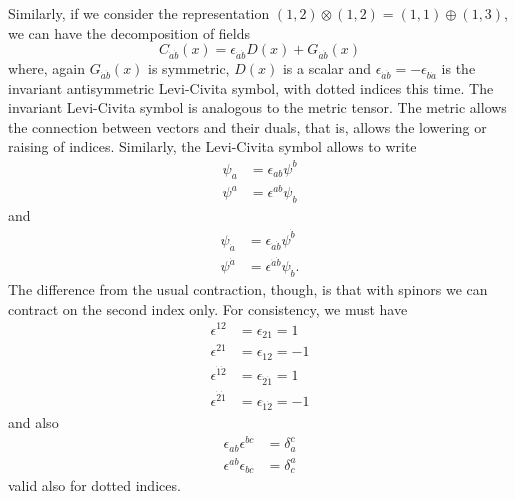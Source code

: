 Similarly, if we consider the representation $(1,2)\otimes(1,2)=(1,1)\oplus(1,3)$, we can have the decomposition of fields
\begin{equation}
    C_{\dot{a}\dot{b}}(x)=\epsilon_{\dot{a}\dot{b}}D(x)+G_{\dot{a}\dot{b}}(x)
\end{equation}
where, again $G_{\dot{a}\dot{b}}(x)$ is symmetric, $D(x)$ is a scalar and $\epsilon_{\dot{a}\dot{b}}=-\epsilon_{\dot{b}\dot{a}}$ is the invariant antisymmetric Levi-Civita symbol, with dotted indices this time. The invariant Levi-Civita symbol is analogous to the metric tensor. The metric allows the connection between vectors and their duals, that is, allows the lowering or raising of indices. Similarly, the Levi-Civita symbol allows to write
\begin{equation}
    \begin{aligned}
    \psi_a&=\epsilon_{ab}\psi^b\\
    \psi^a&=\epsilon^{ab}\psi_b
    \end{aligned}
\end{equation}
and
\begin{equation}
    \begin{aligned}
    \psi_{\dot{a}}&=\epsilon_{\dot{a}\dot{b}}\psi^{\dot{b}}\\
    \psi^{\dot{a}}&=\epsilon^{\dot{a}\dot{b}}\psi_{\dot{b}}.
    \end{aligned}
\end{equation}
The difference from the usual contraction, though, is that with spinors we can contract on the second index only. For consistency, we must have
\begin{equation}
    \begin{aligned}
    \epsilon^{{1}{2}}&=\epsilon_{{2}{1}}=1\\
    \epsilon^{{2}{1}}&=\epsilon_{{1}{2}}=-1
    \end{aligned}
\end{equation}
\begin{equation}
    \begin{aligned}
    \epsilon^{\dot{1}\dot{2}}&=\epsilon_{\dot{2}\dot{1}}=1\\
    \epsilon^{\dot{2}\dot{1}}&=\epsilon_{\dot{1}\dot{2}}=-1
    \end{aligned}
\end{equation}
and also
\begin{equation}
\begin{aligned}
\epsilon_{ab}\epsilon^{bc}&=\delta_a^c\\
\epsilon^{ab}\epsilon_{bc}&=\delta^a_c
\end{aligned}
\end{equation}
valid also for dotted indices.\\

